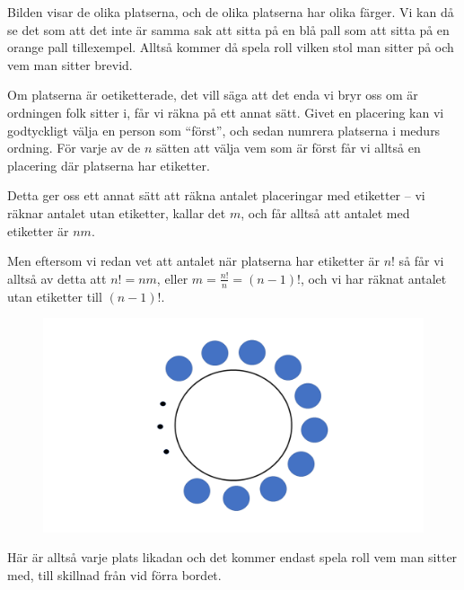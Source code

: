 \documentclass{tufte-handout}
\begin{document}
\begin{example}
        Bilden visar de olika platserna, och de olika platserna har olika färger. Vi kan då se det som att det inte är samma sak att sitta på en blå pall som att sitta på en orange pall tillexempel. Alltså kommer då spela roll vilken stol man sitter på och vem man sitter brevid. 

	Om platserna är oetiketterade, det vill säga att det enda vi bryr oss om är ordningen folk sitter i, får vi räkna på ett annat sätt. Givet en placering kan vi godtyckligt välja en person som ``först'', och sedan numrera platserna i medurs ordning. För varje av de $n$ sätten att välja vem som är först får vi alltså en placering där platserna har etiketter.

	Detta ger oss ett annat sätt att räkna antalet placeringar med etiketter -- vi räknar antalet utan etiketter, kallar det $m$, och får alltså att antalet med etiketter är $nm$.

	Men eftersom vi redan vet att antalet när platserna har etiketter är $n!$ så får vi alltså av detta att $n! = nm$, eller $m = \frac{n!}{n} = (n-1)!$, och vi har räknat antalet utan etiketter till $(n-1)!$.
 
 \begin{figure}[h]    \includegraphics{graphics/bordutanfarg1.png}
\end{figure}

       Här är alltså varje plats likadan och det kommer endast spela roll vem man sitter med, till skillnad från vid förra bordet. 
\end{example}
\end{document}
